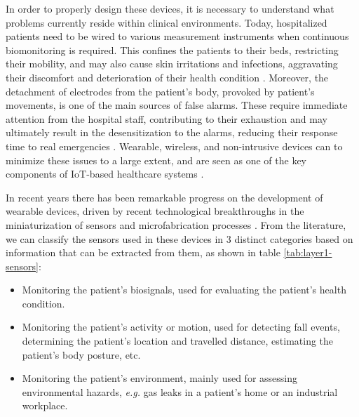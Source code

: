 In order to properly design these devices, it is necessary to understand what problems currently reside within clinical environments. Today, hospitalized patients need to be wired to various measurement instruments when continuous biomonitoring is required. This confines the patients to their beds, restricting their mobility, and may also cause skin irritations and infections, aggravating their discomfort and deterioration of their health condition \cite{Darwish2011}. Moreover, the detachment of electrodes from the patient's body, provoked by patient's movements, is one of the main sources of false alarms. These require immediate attention from the hospital staff, contributing to their exhaustion and may ultimately result in the desensitization to the alarms, reducing their response time to real emergencies \cite{DursunErgezen2020}. Wearable, wireless, and non-intrusive devices can to minimize these issues to a large extent, and are seen as one of the key components of \acs{IoT}-based healthcare systems \cite{Baker2017}.  \bigskip

In recent years there has been remarkable progress on the development of wearable devices, driven by recent technological breakthroughs in the miniaturization of sensors and microfabrication processes \cite{Adame2018}. From the literature, we can classify the sensors used in these devices in 3 distinct categories based on information that can be extracted from them, as shown in table \ref{tab:layer1-sensors}:

\begin{itemize}
    \item Monitoring the patient's biosignals, used for evaluating the patient's health condition.
    \item Monitoring the patient's activity or motion, used for detecting fall events, determining the patient's location and travelled distance, estimating the patient's body posture, etc.
    \item Monitoring the patient's environment, mainly used for assessing environmental hazards, \textit{e.g.} gas leaks in a patient's home or an industrial workplace.
\end{itemize}

